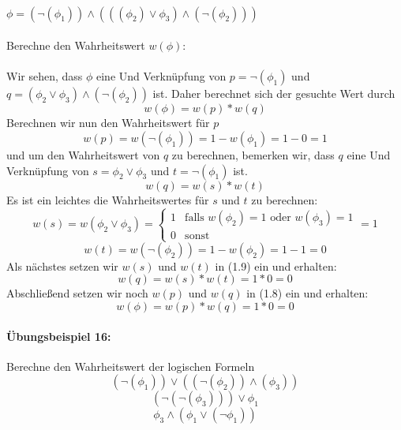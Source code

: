 \documentclass[11pt,a4paper,leqno]{report}
\numberwithin{equation}{chapter}
\begin{document}
\\
$\phi = (\neg(\phi_1))\wedge(((\phi_2)\vee\phi_3)\wedge(\neg(\phi_2)))$\\
\\
Berechne den Wahrheitswert $w(\phi)$:\\
\\
Wir sehen, dass $\phi$ eine Und Verkn\"upfung von $p=\neg(\phi_1)$ und\\ $q=(\phi_2\vee\phi_3)\wedge(\neg(\phi_2))$ ist. Daher berechnet sich der gesuchte Wert durch
\begin{equation}
	w(\phi) = w(p) * w(q)
\end{equation}
Berechnen wir nun den Wahrheitswert f\"ur $p$
$$w(p) = w(\neg(\phi_1)) = 1 - w(\phi_1) = 1 - 0 = 1$$
und um den Wahrheitswert von $q$ zu berechnen, bemerken wir, dass $q$ eine Und Verkn\"upfung von $s=\phi_2\vee\phi_3$ und $t=\neg(\phi_1)$ ist.
\begin{equation}
	w(q) = w(s) * w(t)
\end{equation}
Es ist ein leichtes die Wahrheitswertes f\"ur $s$ und $t$ zu berechnen:
$$w(s) = w(\phi_2\vee\phi_3) = 
\begin{cases} 
1 & \text{falls }w(\phi_2)=1\text{ oder }w(\phi_3)=1\\
0 & \text{sonst}
\end{cases} = 1$$
$$w(t)=w(\neg(\phi_2)) = 1 - w(\phi_2) = 1 - 1 = 0$$
Als n\"achstes setzen wir $w(s)$ und $w(t)$ in (1.9) ein und erhalten:
$$w(q) = w(s) * w(t) = 1 * 0 = 0$$
Abschlie\ss{}end setzen wir noch $w(p)$ und $w(q)$ in (1.8) ein und erhalten:
$$w(\phi) = w(p) * w(q) = 1 * 0 = 0$$
\paragraph{\"Ubungsbeispiel 16:} Berechne den Wahrheitswert der logischen Formeln $$(\neg(\phi_1))\vee((\neg(\phi_2))\wedge(\phi_3))$$ $$(\neg(\neg(\phi_3)))\vee\phi_1$$
$$\phi_3\wedge(\phi_1\vee(\neg\phi_1))$$
\end{document}
